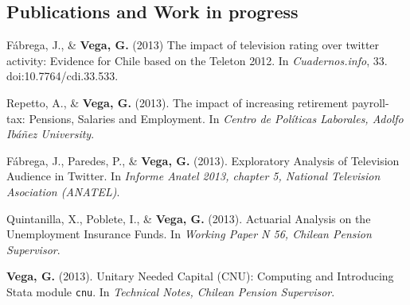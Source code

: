 \documentclass[letterpaper, 11pt]{article}
\renewenvironment{itemize}{
  \begin{list}{}{
    \setlength{\leftmargin}{0.45cm}
  }
}{
  \end{list}
}
\begin{document}
\subsection*{Publications and Work in progress}
\begin{itemize}
\item F\'abrega, J., \& {\bf Vega, G.} (2013) The impact of television rating over twitter activity: Evidence for Chile based on the Teleton 2012. In {\it Cuadernos.info}, 33. doi:10.7764/cdi.33.533.
\item Repetto, A., \& {\bf Vega, G.} (2013). The impact of increasing retirement payroll-tax: Pensions, Salaries and Employment. In {\it Centro de Pol\'iticas Laborales, Adolfo Ib\'a\~nez University}.
\item F\'abrega, J., Paredes, P., \& {\bf Vega, G.} (2013). Exploratory Analysis of Television Audience in Twitter. In {\it Informe Anatel 2013, chapter 5, National Television Asociation (ANATEL)}.
\item Quintanilla, X., Poblete, I., \& {\bf Vega, G.} (2013). Actuarial Analysis on the Unemployment Insurance Funds. In {\it Working Paper N 56, Chilean Pension Supervisor}.
\item {\bf Vega, G.} (2013). Unitary Needed Capital (CNU): Computing and Introducing Stata module {\tt cnu}. In {\it Technical Notes, Chilean Pension Supervisor}.
\end{itemize}
\end{document}
